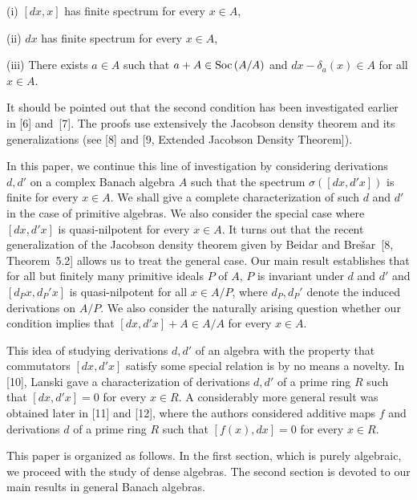 \documentclass{amse}
\numberwithin{equation}{section}
\begin{document}
 (i)\; $[dx,x]$ has finite spectrum for every $x \in A$,

 (ii)\; $dx$ has finite spectrum for every $x \in A$,

 (iii)\; There exists $a \in A$ such that $ a+  A \in {\rm Soc}\,(A/ A) $ and $dx- \delta_a(x) \in  A$ for all $x \in
 A$.

 \noindent It should be pointed out that the second condition has
 been investigated earlier in [6] and~[7].  The proofs use extensively
 the Jacobson density theorem and its generalizations (see [8] and
  [9, Extended Jacobson Density Theorem]).

 In this paper, we continue this line of investigation by
 considering derivations $d,d'$ on a complex Banach algebra $A$
 such that the spectrum $ \sigma([dx,d'x])$ is finite for every $x
 \in A$. We shall give a complete characterization of
such $d$ and $d'$ in the case of primitive algebras. We also
consider the special case where $[dx,d'x]$ is quasi-nilpotent for
every $x \in A$.  It turns out that the recent generalization of
the Jacobson density theorem
 given by Beidar and Bre\v{s}ar~[8, Theorem~5.2] allows us to
 treat the general case. Our main result establishes that for all
 but finitely many primitive ideals $P$ of $A$, $P$ is invariant
 under $d$ and $d'$ and $[d_Px, d_P'x]$ is quasi-nilpotent for all
 $x \in A/P$, where $d_P, d_P'$ denote the induced derivations on
 $A/P$. We also  consider the naturally
arising question  whether our condition implies that $ [dx,d'x] +
 A \in  A/  A$ for every $x \in A$.

 This idea of studying derivations $d,d'$ of an algebra with the
 property that  commutators
  $[dx,d'x]$ satisfy some special relation is by no means a novelty.
  In [10], Lanski gave a characterization of derivations $d,d'$ of a
  prime ring $R$ such that $[dx,d'x]=0$ for every $ x \in R$. A
  considerably more general result was obtained later in [11]
  and [12], where the authors considered additive maps
  $f$ and derivations $d$ of a prime ring $R$ such that $
  [f(x),dx]=0$ for every $x \in R$. \par This paper is organized as
  follows. In the first section, which is purely algebraic, we
  proceed with the study of dense algebras.  The second
  section is devoted to our main results in  general Banach
  algebras.
\end{document}
